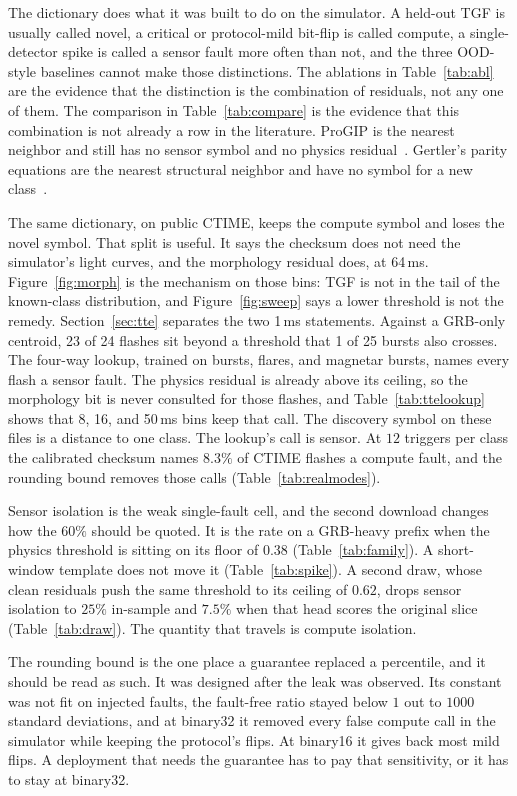 \documentclass[preprint,12pt]{elsarticle}
\begin{document}
The dictionary does what it was built to do on the simulator. A held-out TGF is usually called novel, a critical or protocol-mild bit-flip is called compute, a single-detector spike is called a sensor fault more often than not, and the three OOD-style baselines cannot make those distinctions. The ablations in Table~\ref{tab:abl} are the evidence that the distinction is the combination of residuals, not any one of them. The comparison in Table~\ref{tab:compare} is the evidence that this combination is not already a row in the literature. ProGIP is the nearest neighbor and still has no sensor symbol and no physics residual~\cite{progip2025}. Gertler's parity equations are the nearest structural neighbor and have no symbol for a new class~\cite{gertler1990}.

The same dictionary, on public CTIME, keeps the compute symbol and loses the novel symbol. That split is useful. It says the checksum does not need the simulator's light curves, and the morphology residual does, at 64\,ms. Figure~\ref{fig:morph} is the mechanism on those bins: TGF is not in the tail of the known-class distribution, and Figure~\ref{fig:sweep} says a lower threshold is not the remedy. Section~\ref{sec:tte} separates the two 1\,ms statements. Against a GRB-only centroid, 23 of 24 flashes sit beyond a threshold that 1 of 25 bursts also crosses. The four-way lookup, trained on bursts, flares, and magnetar bursts, names every flash a sensor fault. The physics residual is already above its ceiling, so the morphology bit is never consulted for those flashes, and Table~\ref{tab:ttelookup} shows that 8, 16, and 50\,ms bins keep that call. The discovery symbol on these files is a distance to one class. The lookup's call is sensor. At $12$ triggers per class the calibrated checksum names $8.3\%$ of CTIME flashes a compute fault, and the rounding bound removes those calls (Table~\ref{tab:realmodes}).

Sensor isolation is the weak single-fault cell, and the second download changes how the $60\%$ should be quoted. It is the rate on a GRB-heavy prefix when the physics threshold is sitting on its floor of $0.38$ (Table~\ref{tab:family}). A short-window template does not move it (Table~\ref{tab:spike}). A second draw, whose clean residuals push the same threshold to its ceiling of $0.62$, drops sensor isolation to $25\%$ in-sample and $7.5\%$ when that head scores the original slice (Table~\ref{tab:draw}). The quantity that travels is compute isolation.

The rounding bound is the one place a guarantee replaced a percentile, and it should be read as such. It was designed after the leak was observed. Its constant was not fit on injected faults, the fault-free ratio stayed below $1$ out to $1000$ standard deviations, and at binary32 it removed every false compute call in the simulator while keeping the protocol's flips. At binary16 it gives back most mild flips. A deployment that needs the guarantee has to pay that sensitivity, or it has to stay at binary32.
\end{document}
